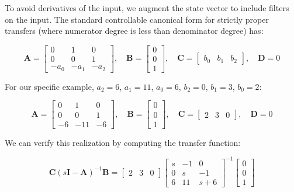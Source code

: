 To avoid derivatives of the input, we augment the state vector to include filters on the input. The standard controllable canonical form for strictly proper transfers (where numerator degree is less than denominator degree) has:

\begin{equation}
\mathbf{A} = \begin{bmatrix}
0 & 1 & 0 \\
0 & 0 & 1 \\
-a_0 & -a_1 & -a_2
\end{bmatrix}, \quad
\mathbf{B} = \begin{bmatrix} 0 \\ 0 \\ 1 \end{bmatrix}, \quad
\mathbf{C} = \begin{bmatrix} b_0 & b_1 & b_2 \end{bmatrix}, \quad
\mathbf{D} = 0
\end{equation}

For our specific example, $a_2 = 6$, $a_1 = 11$, $a_0 = 6$, $b_2 = 0$, $b_1 = 3$, $b_0 = 2$:

\begin{equation}
\mathbf{A} = \begin{bmatrix}
0 & 1 & 0 \\
0 & 0 & 1 \\
-6 & -11 & -6
\end{bmatrix}, \quad
\mathbf{B} = \begin{bmatrix} 0 \\ 0 \\ 1 \end{bmatrix}, \quad
\mathbf{C} = \begin{bmatrix} 2 & 3 & 0 \end{bmatrix}, \quad
\mathbf{D} = 0
\end{equation}

We can verify this realization by computing the transfer function:

\begin{equation}
\mathbf{C}(s\mathbf{I} - \mathbf{A})^{-1}\mathbf{B} =
\begin{bmatrix} 2 & 3 & 0 \end{bmatrix}
\begin{bmatrix}
s & -1 & 0 \\
0 & s & -1 \\
6 & 11 & s+6
\end{bmatrix}^{-1}
\begin{bmatrix} 0 \\ 0 \\ 1 \end{bmatrix}
\end{equation}


